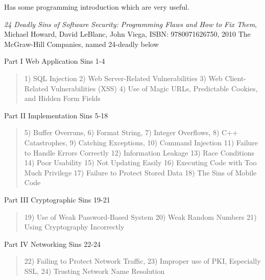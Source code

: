 \documentclass[Screen16to9,17pt]{foils}
\begin{document}
{\footnotesize{}}

Has some programming introduction which are very useful.



\emph{24 Deadly Sins of Software Security: Programming Flaws and How to Fix Them}, Michael Howard, David LeBlanc, John Viega, ISBN: 9780071626750, 2010 The McGraw-Hill Companies, named 24-deadly below


\begin{list1}
\item Part I Web Application Sins 1-4
\begin{quote}
1) SQL Injection
2) Web Server-Related Vulnerabilities
3) Web Client-Related Vulnerabilities (XSS)
4) Use of Magic URLs, Predictable Cookies, and Hidden Form Fields
\end{quote}
\item Part II Implementation Sins 5-18
\begin{quote}
5) Buffer Overruns, 6) Format String, 7) Integer Overflows,
8) C++ Catastrophes, 9) Catching Exceptions, 10) Command Injection
11) Failure to Handle Errors Correctly 12) Information Leakage
13) Race Conditions 14) Poor Usability
15) Not Updating Easily
16) Executing Code with Too Much Privilege
17) Failure to Protect Stored Data
18) The Sins of Mobile Code
\end{quote}
\end{list1}




\begin{list1}
\item Part III Cryptographic Sins 19-21
\begin{quote}
19) Use of Weak Password-Based System
20) Weak Random Numbers
21) Using Cryptography Incorrectly
\end{quote}
\item Part IV Networking Sins 22-24
\begin{quote}
22) Failing to Protect Network Traffic,
23) Improper use of PKI, Especially SSL,
24) Trusting Network Name Resolution
\end{quote}
\end{list1}
\end{document}
